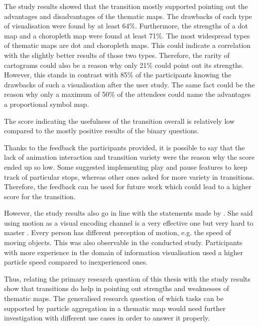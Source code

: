 The study results showed that the transition mostly supported pointing out the advantages and disadvantages of the thematic maps. The drawbacks of each type of visualisation were found by at least 64\%. Furthermore, the strengths of a dot map and a choropleth map were found at least 71\%.
The most widespread types of thematic maps are dot and choropleth maps. This could indicate a correlation with the slightly better results of those two types.
Therefore, the rarity of cartograms could also be a reason why only 21\% could point out its strengths. However, this stands in contrast with 85\% of the participants knowing the drawbacks of such a visualisation after the user study.
The same fact could be the reason  why only a maximum of 50\% of the attendees could name the advantages a proportional symbol map.

The score indicating the usefulness of the transition overall is relatively low compared to the mostly positive results of the binary questions.

Thanks to the feedback the participants provided, it is possible to say that the lack of animation interaction and transition variety were the reason why the score ended up so low. Some suggested implementing play and pause features to keep track of particular stops, whereas other ones asked for more variety in transitions. Therefore, the feedback can be used for future work which could lead to a higher score for the transition.

However, the study results also go in line with the statements made by \citeauthor{Munzner2014}. She said using motion as a visual encoding channel is a very effective one but very hard to master . Every person has different perception of motion, e.g. the speed of moving objects. This was also observable in the conducted study. Participants with more experience in the domain of information visualisation used a higher particle speed compared to inexperienced ones.

Thus, relating the primary research question of this thesis with the study results show that transitions do help in pointing out strengths and weaknesses of thematic maps. The generalised research question of which tasks can be supported by particle aggregation in a thematic map would need further investigation with different use cases in order to answer it properly.
